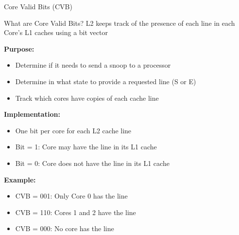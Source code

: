 \documentclass[aspectratio=169,12pt]{beamer}
\begin{document}
\begin{frame}{Core Valid Bits (CVB)}
\begin{block}{What are Core Valid Bits?}
L2 keeps track of the presence of each line in each Core's L1 caches using a bit vector
\end{block}

\vspace{0.5em}
\textbf{Purpose:}
\begin{itemize}
\item Determine if it needs to send a snoop to a processor
\item Determine in what state to provide a requested line (S or E)
\item Track which cores have copies of each cache line
\end{itemize}

\vspace{0.5em}
\textbf{Implementation:}
\begin{itemize}
\item One bit per core for each L2 cache line
\item Bit = 1: Core may have the line in its L1 cache
\item Bit = 0: Core does not have the line in its L1 cache
\end{itemize}

\vspace{0.5em}
\textbf{Example:}
\begin{itemize}
\item CVB = 001: Only Core 0 has the line
\item CVB = 110: Cores 1 and 2 have the line
\item CVB = 000: No core has the line
\end{itemize}
\end{frame}
\end{document}

